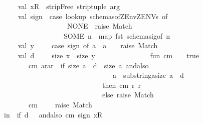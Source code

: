 \begin{isabellebody}
\ \ \ \ \ \ \ \ \ \ \ \ \ \ \ val\ x{\isacharcolon}{\isacharcolon}R\ {\isacharequal}\ stripFree\ {\isacharparenleft}strip{\isacharunderscore}tuple\ arg{\isacharparenright}{\isacharsemicolon}\isanewline
\ \ \ \ \ \ \ \ \ \ \ \ \ \ \ val\ sign\ {\isacharequal}\ {\isacharparenleft}case\ lookup\ {\isacharparenleft}schemas{\isacharunderscore}of{\isacharparenleft}{\isacharbang}ZEnv{\isachardot}ZENV{\isacharparenright}{\isacharcomma}s{\isacharparenright}\ of\isanewline
\ \ \ \ \ \ \ \ \ \ \ \ \ \ \ \ \ \ \ \ \ \ \ \ \ \ \ \ \ NONE\ {\isacharequal}{\isachargreater}\ raise\ Match\ \isanewline
\ \ \ \ \ \ \ \ \ \ \ \ \ \ \ \ \ \ \ \ \ \ \ \ \ \ \ \ {\isacharbar}SOME\ n\ {\isacharequal}{\isachargreater}\ map\ fst\ {\isacharparenleft}schemasig{\isacharunderscore}of\ n{\isacharparenright}{\isacharparenright}{\isacharsemicolon}\isanewline
\ \ \ \ \ \ \ \ \ \ \ \ \ \ \ val\ y\ \ \ \ {\isacharequal}\ case\ sign\ of\ a{\isacharcolon}{\isacharcolon}{\isacharunderscore}\ {\isacharequal}{\isachargreater}\ a\ {\isacharbar}\ {\isacharunderscore}\ {\isacharequal}{\isachargreater}\ raise\ Match{\isacharsemicolon}\isanewline
\ \ \ \ \ \ \ \ \ \ \ \ \ \ \ val\ d\ \ \ \ {\isacharequal}\ {\isacharparenleft}size\ x{\isacharparenright}\ {\isacharminus}\ {\isacharparenleft}size\ y{\isacharparenright}{\isacharsemicolon}\isanewline
\ \ \ \ \ \ \ \ \ \ \ \ \ \ \ fun\ cm\ {\isacharbrackleft}{\isacharbrackright}\ {\isacharbrackleft}{\isacharbrackright}\ {\isacharequal}\ true\isanewline
\ \ \ \ \ \ \ \ \ \ \ \ \ \ \ \ \ \ {\isacharbar}cm\ {\isacharparenleft}a{\isacharcolon}{\isacharcolon}r{\isacharparenright}{\isacharparenleft}a{\isacharprime}{\isacharcolon}{\isacharcolon}r{\isacharprime}{\isacharparenright}\ {\isacharequal}\ if\ {\isacharparenleft}size\ a{\isacharparenright}\ {\isacharplus}\ d\ {\isacharequal}\ size\ a{\isacharprime}\ andalso\isanewline
\ \ \ \ \ \ \ \ \ \ \ \ \ \ \ \ \ \ \ \ \ \ \ \ \ \ \ \ \ \ \ \ \ \ \ \ \ \ \ \ \ \ a\ {\isacharequal}\ {\isacharparenleft}substring{\isacharparenleft}a{\isacharprime}{\isacharcomma}{}{\isacharcomma}size\ a{\isacharprime}\ {\isacharminus}\ d{\isacharparenright}{\isacharparenright}\isanewline
\ \ \ \ \ \ \ \ \ \ \ \ \ \ \ \ \ \ \ \ \ \ \ \ \ \ \ \ \ \ \ \ \ \ \ \ \ \ \ then\ cm\ r\ r{\isacharprime}\isanewline
\ \ \ \ \ \ \ \ \ \ \ \ \ \ \ \ \ \ \ \ \ \ \ \ \ \ \ \ \ \ \ \ \ \ \ \ \ \ \ else\ raise\ Match\isanewline
\ \ \ \ \ \ \ \ \ \ \ \ \ \ \ \ \ \ {\isacharbar}cm\ {\isacharunderscore}\ {\isacharunderscore}\ {\isacharequal}\ \ raise\ Match\isanewline
\ \ \ \ \ \ \ \ \ \ \ in\ \ if\ d\ {\isachargreater}{\isacharequal}\ {}\ andalso\ cm\ sign\ {\isacharparenleft}x{\isacharcolon}{\isacharcolon}R{\isacharparenright}\isanewline

\end{isabellebody}
